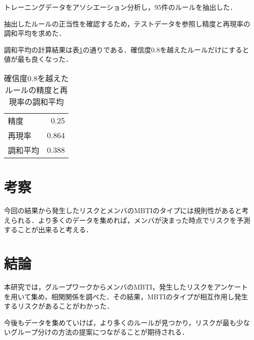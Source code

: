\documentclass[uplatex,twocolumn,dvipdfmx]{jsarticle}
\begin{document}
トレーニングデータをアソシエーション分析し，95件のルールを抽出した．

抽出したルールの正当性を確認するため，テストデータを参照し精度と再現率の調和平均を求めた．

調和平均の計算結果は表\ref{調和平均算出結果}の通りである．確信度0.8を越えたルールだけにすると値が最も良くなった．
\renewcommand{\arraystretch}{0.75}
\begin{table}[htbp]
\centering
\caption{確信度0.8を越えたルールの精度と再現率の調和平均}\label{調和平均算出結果}
\begin{tabular}{l|r}
\hline
精度 & 0.25\\
再現率 & 0.864\\
調和平均 & 0.388\\
\hline
\end{tabular}
\end{table}
\renewcommand{\arraystretch}{0.75}


\section{考察}
今回の結果から発生したリスクとメンバのMBTIのタイプには規則性があると考えられる．より多くのデータを集めれば，メンバが決まった時点でリスクを予測することが出来ると考える．

\section{結論}
本研究では，グループワークからメンバのMBTI，発生したリスクをアンケートを用いて集め，相関関係を調べた．その結果，MBTIのタイプが相互作用し発生するリスクがあることがわかった．

今後もデータを集めていけば，より多くのルールが見つかり，リスクが最も少ないグループ分けの方法の提案につながることが期待される．
\nocite{MBTI}
\nocite{110009915588}

\end{document}
